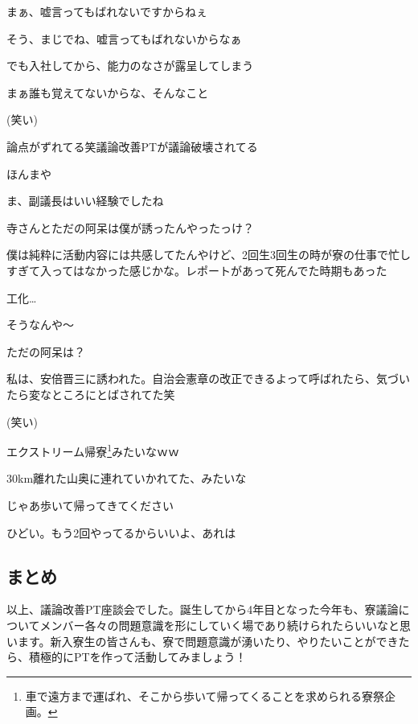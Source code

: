 \begin{multicols}{2}
まぁ、嘘言ってもばれないですからねぇ

そう、まじでね、嘘言ってもばれないからなぁ

でも入社してから、能力のなさが露呈してしまう

まぁ誰も覚えてないからな、そんなこと

(笑い)

論点がずれてる笑議論改善PTが議論破壊されてる

ほんまや

ま、副議長はいい経験でしたね

寺さんとただの阿呆は僕が誘ったんやったっけ？

僕は純粋に活動内容には共感してたんやけど、2回生3回生の時が寮の仕事で忙しすぎて入ってはなかった感じかな。レポートがあって死んでた時期もあった

工化…

そうなんや〜

ただの阿呆は？

私は、安倍晋三に誘われた。自治会憲章の改正できるよって呼ばれたら、気づいたら変なところにとばされてた笑

(笑い)

エクストリーム帰寮\footnote{車で遠方まで運ばれ、そこから歩いて帰ってくることを求められる寮祭企画。}みたいなｗｗ

30km離れた山奥に連れていかれてた、みたいな

じゃあ歩いて帰ってきてください

ひどい。もう2回やってるからいいよ、あれは

\subsection{まとめ}

以上、議論改善PT座談会でした。誕生してから4年目となった今年も、寮議論についてメンバー各々の問題意識を形にしていく場であり続けられたらいいなと思います。新入寮生の皆さんも、寮で問題意識が湧いたり、やりたいことができたら、積極的にPTを作って活動してみましょう！

\end{multicols}


